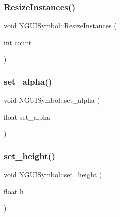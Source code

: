 \hypertarget{class_n_g_u_i_symbol_a964aa4be5cfabdd98cdf43b3ec69bc11}{}\label{class_n_g_u_i_symbol_a964aa4be5cfabdd98cdf43b3ec69bc11} 
\subsubsection{\texorpdfstring{Resize\+Instances()}{ResizeInstances()}}
{\footnotesize\ttfamily void N\+G\+U\+I\+Symbol\+::\+Resize\+Instances (\begin{DoxyParamCaption}\item[{int}]{count }\end{DoxyParamCaption})}

\hypertarget{class_n_g_u_i_symbol_a7e1ed7609a96cc2c13a3e464511b6592}{}\label{class_n_g_u_i_symbol_a7e1ed7609a96cc2c13a3e464511b6592} 
\subsubsection{\texorpdfstring{set\+\_\+alpha()}{set\_alpha()}}
{\footnotesize\ttfamily void N\+G\+U\+I\+Symbol\+::set\+\_\+alpha (\begin{DoxyParamCaption}\item[{float}]{set\+\_\+alpha }\end{DoxyParamCaption})}

\hypertarget{class_n_g_u_i_symbol_a4bc99914cb78ebeb8bf8c25fd543b612}{}\label{class_n_g_u_i_symbol_a4bc99914cb78ebeb8bf8c25fd543b612} 
\subsubsection{\texorpdfstring{set\+\_\+height()}{set\_height()}}
{\footnotesize\ttfamily void N\+G\+U\+I\+Symbol\+::set\+\_\+height (\begin{DoxyParamCaption}\item[{float}]{h }\end{DoxyParamCaption})}

\hypertarget{class_n_g_u_i_symbol_a0579ecae747013be5368855c06f5581c}{}\label{class_n_g_u_i_symbol_a0579ecae747013be5368855c06f5581c} 
